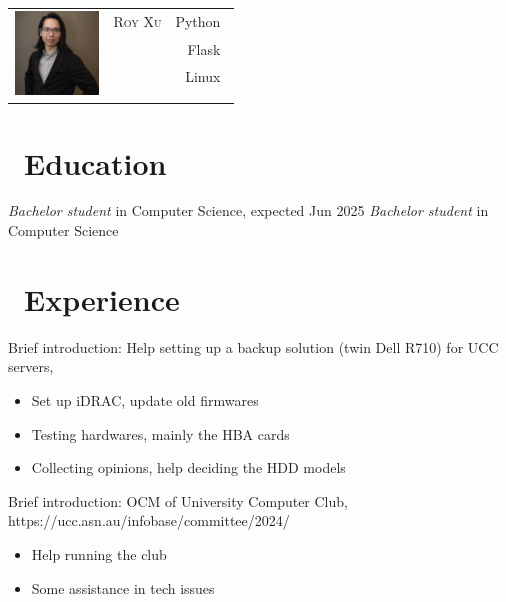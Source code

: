 \documentclass{resume}
\begin{document}

{
\Large{
  \begin{tabu}{ c l r }
    & \scshape{Roy Xu} & {Python~} \\
    &  & {Flask~} \\
    &  & {Linux~} \\
    & \\
    & 
  \end{tabu}
}
}

\section{\faGraduationCap\ Education}
\textit{Bachelor student} in Computer Science, expected Jun 2025
\textit{Bachelor student} in Computer Science

\section{\faUsers\ Experience}
Brief introduction: Help setting up a backup solution (twin Dell R710) for UCC servers, 
\begin{itemize}
  \item Set up iDRAC, update old firmwares
  \item Testing hardwares, mainly the HBA cards
  \item Collecting opinions, help deciding the HDD models
\end{itemize}


Brief introduction: OCM of University Computer Club, https://ucc.asn.au/infobase/committee/2024/
\begin{itemize}
  \item Help running the club
  \item Some assistance in tech issues
\end{itemize}
\end{document}
